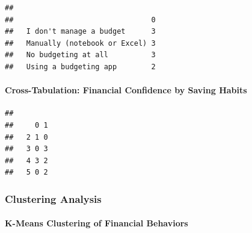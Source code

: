 \documentclass[
]{article}
\newenvironment{Shaded}{\begin{snugshade}}{\end{snugshade}}
\newcommand{\CommentTok}[1]{\textcolor[rgb]{0.56,0.35,0.01}{\textit{#1}}}
\newcommand{\FunctionTok}[1]{\textcolor[rgb]{0.13,0.29,0.53}{\textbf{#1}}}
\newcommand{\NormalTok}[1]{#1}
\newcommand{\OtherTok}[1]{\textcolor[rgb]{0.56,0.35,0.01}{#1}}
\newcommand{\SpecialCharTok}[1]{\textcolor[rgb]{0.81,0.36,0.00}{\textbf{#1}}}
\begin{document}
\begin{Shaded}
\end{Shaded}

\begin{verbatim}
##                               
##                                0
##   I don't manage a budget      3
##   Manually (notebook or Excel) 3
##   No budgeting at all          3
##   Using a budgeting app        2
\end{verbatim}

\paragraph{Cross-Tabulation: Financial Confidence by Saving
Habits}\label{cross-tabulation-financial-confidence-by-saving-habits}

\begin{Shaded}
\end{Shaded}

\begin{verbatim}
##    
##     0 1
##   2 1 0
##   3 0 3
##   4 3 2
##   5 0 2
\end{verbatim}

\subsubsection{Clustering Analysis}\label{clustering-analysis}

\paragraph{K-Means Clustering of Financial
Behaviors}\label{k-means-clustering-of-financial-behaviors}
\end{document}
